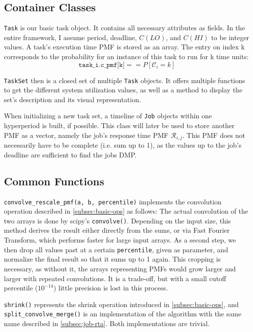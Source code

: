 \documentclass[a4paper,oneside]{csthesis}
\begin{document}
\subsection{Container Classes}
\texttt{Task} is our basic task object. It contains all necessary attributes as fields. In the entire framework, I assume period, deadline, $C(LO)$, and $C(HI)$ to be integer values. A task's execution time PMF is stored as an array. The entry on index k corresponds to the probability for an instance of this task to run for k time units:
\begin{equation*}
    \texttt{task\_i.c\_pmf[k]} == P[\mathcal{C}_i = k]
\end{equation*}


\texttt{TaskSet} then is a closed set of multiple \texttt{Task} objects. It offers multiple functions to get the different system utilization values, as well as a method to display the set's description and its visual representation. 

When initializing a new task set, a timeline of \texttt{Job} objects within one hyperperiod is built, if possible. This class will later be used to store another PMF as a vector, namely the job's response time PMF $\mathcal{R}_{i,j}$. This PMF does not necessarily have to be complete (i.e. sum up to 1), as the values up to the job's deadline are sufficient to find the jobs DMP.

\subsection{Common Functions}
\texttt{convolve\_rescale\_pmf(a, b, percentile)} implements the convolution operation described in \cref{subsec:basic-ops} as follows: The actual convolution of the two arrays is done by scipy's \texttt{convolve()}. Depending on the input size, this method derives the result either directly from the sums, or via Fast Fourier Transform, which performs faster for large input arrays. As a second step, we then drop all values past at a certain \texttt{percentile}, given as parameter, and normalize the final result so that it sums up to 1 again. This cropping is necessary, as without it, the arrays representing PMFs would grow larger and larger with repeated convolutions. It is a trade-off, but with a small cutoff percentile ($10^{-14}$) little precision is lost in this process.

\texttt{shrink()} represents the shrink operation introduced in \cref{subsec:basic-ops}, and \texttt{split\_convolve\_merge()} is an implementation of the algorithm with the same name described in \cref{subsec:job-rta}. Both implementations are trivial.
\end{document}
